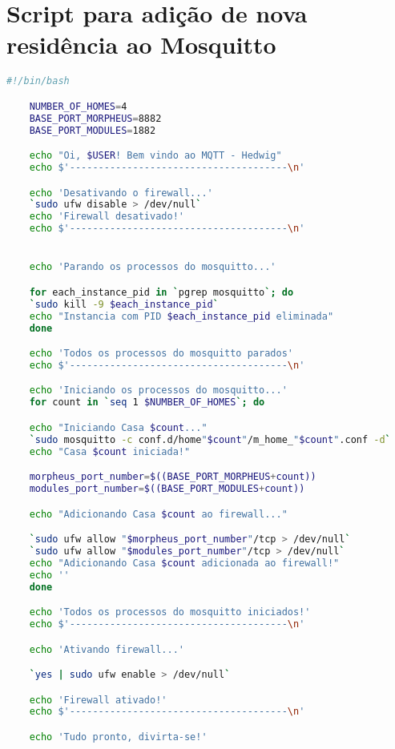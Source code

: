 \chapter{Script para adição de nova residência ao Mosquitto}
\label{att:script}

\begin{lstlisting}[language=bash]
    #!/bin/bash

    NUMBER_OF_HOMES=4
    BASE_PORT_MORPHEUS=8882
    BASE_PORT_MODULES=1882

    echo "Oi, $USER! Bem vindo ao MQTT - Hedwig"
    echo $'--------------------------------------\n'

    echo 'Desativando o firewall...'
    `sudo ufw disable > /dev/null`
    echo 'Firewall desativado!'
    echo $'--------------------------------------\n'


    echo 'Parando os processos do mosquitto...'

    for each_instance_pid in `pgrep mosquitto`; do
    `sudo kill -9 $each_instance_pid`
    echo "Instancia com PID $each_instance_pid eliminada"
    done

    echo 'Todos os processos do mosquitto parados'
    echo $'--------------------------------------\n'

    echo 'Iniciando os processos do mosquitto...'
    for count in `seq 1 $NUMBER_OF_HOMES`; do

    echo "Iniciando Casa $count..."
    `sudo mosquitto -c conf.d/home"$count"/m_home_"$count".conf -d`
    echo "Casa $count iniciada!"

    morpheus_port_number=$((BASE_PORT_MORPHEUS+count))
    modules_port_number=$((BASE_PORT_MODULES+count))

    echo "Adicionando Casa $count ao firewall..."

    `sudo ufw allow "$morpheus_port_number"/tcp > /dev/null`
    `sudo ufw allow "$modules_port_number"/tcp > /dev/null`
    echo "Adicionando Casa $count adicionada ao firewall!"
    echo ''
    done

    echo 'Todos os processos do mosquitto iniciados!'
    echo $'--------------------------------------\n'

    echo 'Ativando firewall...'

    `yes | sudo ufw enable > /dev/null`

    echo 'Firewall ativado!'
    echo $'--------------------------------------\n'

    echo 'Tudo pronto, divirta-se!'
\end{lstlisting}
